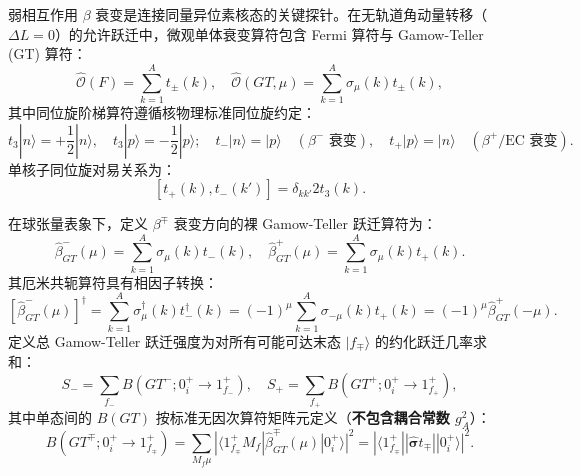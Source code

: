 弱相互作用 $\beta$ 衰变是连接同量异位素核态的关键探针。在无轨道角动量转移（$\Delta L = 0$）的允许跃迁中，微观单体衰变算符包含 Fermi 算符与 Gamow-Teller (GT) 算符：
\begin{equation}\label{eq:2-7-weak-operators}
\hat{\mathcal{O}}(F) = \sum_{k=1}^A t_\pm(k), \quad \hat{\mathcal{O}}(GT, \mu) = \sum_{k=1}^A \sigma_\mu(k) t_\pm(k),
\end{equation}
其中同位旋阶梯算符遵循核物理标准同位旋约定：
\begin{equation}\label{eq:2-7-isospin-ladder-convention}
t_3 |n\rangle = +\frac{1}{2} |n\rangle, \quad t_3 |p\rangle = -\frac{1}{2} |p\rangle; \quad t_- |n\rangle = |p\rangle \quad (\beta^-\text{ 衰变}), \quad t_+ |p\rangle = |n\rangle \quad (\beta^+\text{/EC 衰变}).
\end{equation}
单核子同位旋对易关系为：
\begin{equation}\label{eq:2-7-isospin-commutator}
[t_+(k), t_-(k')] = \delta_{kk'} 2 t_3(k).
\end{equation}

在球张量表象下，定义 $\beta^\mp$ 衰变方向的裸 Gamow-Teller 跃迁算符为：
\begin{equation}\label{eq:2-7-beta-GT-pm}
\hat{\beta}^-_{GT}(\mu) = \sum_{k=1}^A \sigma_\mu(k) t_-(k), \quad \hat{\beta}^+_{GT}(\mu) = \sum_{k=1}^A \sigma_\mu(k) t_+(k).
\end{equation}
其厄米共轭算符具有相因子转换：
\begin{equation}\label{eq:2-7-hermitian-conjugate}
[\hat{\beta}^-_{GT}(\mu)]^\dagger = \sum_{k=1}^A \sigma_\mu^\dagger(k) t_-^\dagger(k) = (-1)^\mu \sum_{k=1}^A \sigma_{-\mu}(k) t_+(k) = (-1)^\mu \hat{\beta}^+_{GT}(-\mu).
\end{equation}
定义总 Gamow-Teller 跃迁强度为对所有可能可达末态 $|f_\mp\rangle$ 的约化跃迁几率求和：
\begin{equation}\label{eq:2-7-sum-definitions}
S_- = \sum_{f_-} B(GT^-; 0^+_i \to 1^+_{f_-}), \quad S_+ = \sum_{f_+} B(GT^+; 0^+_i \to 1^+_{f_+}),
\end{equation}
其中单态间的 $B(GT)$ 按标准无因次算符矩阵元定义（\textbf{不包含耦合常数 $g_A^2$}）：
\begin{equation}\label{eq:2-7-BGT-bare-def}
B(GT^\mp; 0^+_i \to 1^+_{f_\mp}) = \sum_{M_f \mu} |\langle 1^+_{f_\mp} M_f | \hat{\beta}^\mp_{GT}(\mu) | 0^+_i \rangle|^2 = |\langle 1^+_{f_\mp} || \hat{\boldsymbol{\sigma}} t_\mp || 0^+_i \rangle|^2.
\end{equation}

